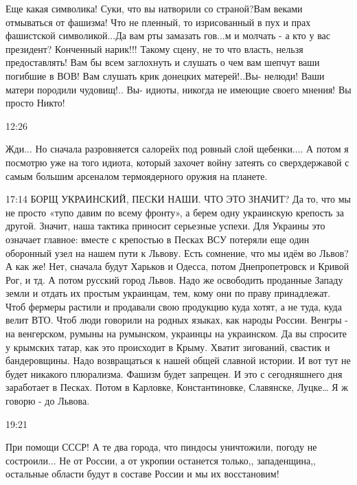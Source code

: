 
Еще какая символика! Суки, что вы натворили со страной?Вам веками отмываться от
фашизма! Что не пленный, то изрисованный в пух и прах фашистской
символикой...Да вам рты замазать гов...м и молчать - а кто у вас президент?
Конченный нарик!!! Такому сцену, не то что власть, нельзя предоставлять! Вам бы
всем заглохнуть и слушать о чем вам шепчут ваши погибшие в ВОВ! Вам слушать
крик донецких матерей!..Вы- нелюди! Ваши матери породили чудовищ!.. Вы- идиоты,
никогда не имеющие своего мнения! Вы просто Никто!

12:26

Жди... Но сначала разровняется салорейх под ровный слой щебенки.... А потом я
посмотрю уже на того идиота, который захочет войну затеять со сверхдержавой с
самым большим арсеналом термоядерного оружия на планете.

17:14
БОРЩ УКРАИНСКИЙ, ПЕСКИ НАШИ. ЧТО ЭТО ЗНАЧИТ?
Да то, что мы не просто «тупо давим по всему фронту», а берем одну украинскую крепость за другой. Значит, наша тактика приносит серьезные успехи.
Для Украины это означает главное: вместе с крепостью в Песках ВСУ потеряли еще один оборонный узел на нашем пути к Львову.
Есть сомнение, что мы идём во Львов? А как же!
Нет, сначала будут Харьков и Одесса, потом Днепропетровск и Кривой Рог, и тд. А потом русский город Львов.
Надо же освободить проданные Западу земли и отдать их простым украинцам, тем, кому они по праву принадлежат. Чтоб фермеры растили и продавали свою продукцию куда хотят, а не туда, куда велит ВТО.
Чтоб люди говорили на родных языках, как народы России. Венгры - на венгерском, румыны на румынском, украинцы на украинском. Да вы спросите у крымских татар, как это происходит в Крыму.
Хватит зигований, свастик и бандеровщины. Надо возвращаться к нашей общей славной истории. И вот тут не будет никакого плюрализма. Фашизм будет запрещен.
И это с сегодняшнего дня заработает в Песках. Потом в Карловке, Константиновке, Славянске, Луцке… Я ж говорю - до Львова.

19:21

При помощи СССР! А те два города, что пиндосы уничтожили, погоду не
состроили... Не от России, а от укропии останется только,, западенщина,,
остальные области будут в составе России и мы их восстановим!


